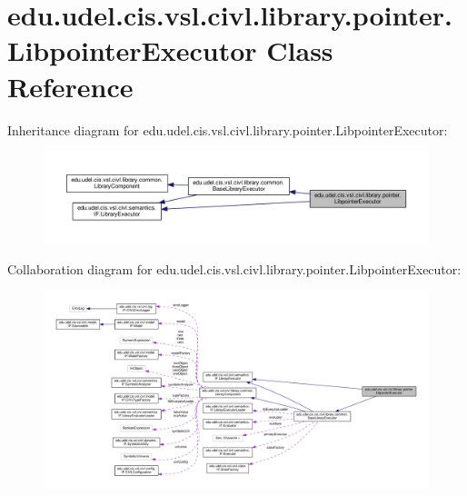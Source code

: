 \hypertarget{classedu_1_1udel_1_1cis_1_1vsl_1_1civl_1_1library_1_1pointer_1_1LibpointerExecutor}{}\section{edu.\+udel.\+cis.\+vsl.\+civl.\+library.\+pointer.\+Libpointer\+Executor Class Reference}
\label{classedu_1_1udel_1_1cis_1_1vsl_1_1civl_1_1library_1_1pointer_1_1LibpointerExecutor}


Inheritance diagram for edu.\+udel.\+cis.\+vsl.\+civl.\+library.\+pointer.\+Libpointer\+Executor\+:
\nopagebreak
\begin{figure}[H]
\begin{center}
\leavevmode
\includegraphics[width=350pt]{classedu_1_1udel_1_1cis_1_1vsl_1_1civl_1_1library_1_1pointer_1_1LibpointerExecutor__inherit__graph}
\end{center}
\end{figure}


Collaboration diagram for edu.\+udel.\+cis.\+vsl.\+civl.\+library.\+pointer.\+Libpointer\+Executor\+:
\nopagebreak
\begin{figure}[H]
\begin{center}
\leavevmode
\includegraphics[width=350pt]{classedu_1_1udel_1_1cis_1_1vsl_1_1civl_1_1library_1_1pointer_1_1LibpointerExecutor__coll__graph}
\end{center}
\end{figure}
